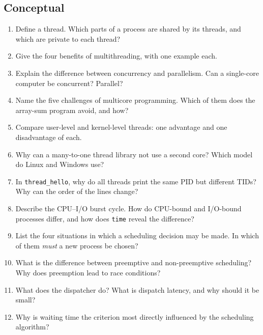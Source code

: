 \documentclass[11pt,a4paper]{article}
\newcommand{\cmd}[1]{\texttt{#1}}
\begin{document}
\subsection*{Conceptual}
\begin{enumerate}[leftmargin=1.6em]
  \item Define a thread. Which parts of a process are shared by its threads, and which are private to each thread?
  \item Give the four benefits of multithreading, with one example each.
  \item Explain the difference between concurrency and parallelism. Can a single-core computer be concurrent? Parallel?
  \item Name the five challenges of multicore programming. Which of them does the array-sum program avoid, and how?
  \item Compare user-level and kernel-level threads: one advantage and one disadvantage of each.
  \item Why can a many-to-one thread library not use a second core? Which model do Linux and Windows use?
  \item In \cmd{thread\_hello}, why do all threads print the same PID but different TIDs? Why can the order of the lines change?
  \item Describe the CPU--I/O burst cycle. How do CPU-bound and I/O-bound processes differ, and how does \cmd{time} reveal the difference?
  \item List the four situations in which a scheduling decision may be made. In which of them \emph{must} a new process be chosen?
  \item What is the difference between preemptive and non-preemptive scheduling? Why does preemption lead to race conditions?
  \item What does the dispatcher do? What is dispatch latency, and why should it be small?
  \item Why is waiting time the criterion most directly influenced by the scheduling algorithm?
\end{enumerate}
\end{document}
